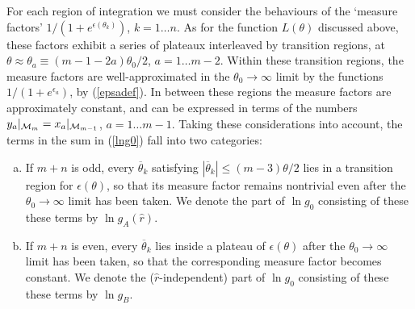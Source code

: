 \documentclass[11pt]{article}
\newcommand\phup{^{\phantom o}}
\newcommand{\CM}{{\cal M}}
\newcommand{\te}{\theta}
\newcommand{\tz}{\theta_0}
\newcommand{\goA}{g\phup_{A}}
\newcommand{\goB}{g\phup_{B}}
\begin{document}
For each region of integration we must consider the behaviours
of the `measure factors' $1/(1+e^{\epsilon(\theta_k)})$, $k=1\dots n$.
As for the function $L(\theta)$ discussed above, these factors exhibit
a series of plateaux interleaved by transition regions, at
$\theta\approx\theta_a\equiv (m{-}1{-}2a)\tz/2$, 
$a=1\dots m{-}2$. Within these
transition regions, the measure factors
are well-approximated in the $\tz\to\infty$ limit by the
functions $1/(1+e^{\epsilon_a})$, by (\ref{epsadef}). In between these
regions the measure factors are approximately constant, and can be
expressed in terms of the numbers $y_a|_{\CM_m}=x_a|_{\CM_{m-1}}$,
$a=1\dots m{-}1$. Taking these considerations into account,
the terms in the sum in (\ref{lng0}) fall into two categories:
%
\begin{enumerate}[(a)]
\item If $m+n$ is odd, every $\overline\te_k$ satisfying 
$|\overline\te_k|\le
(m{-}3)\te/2$ lies in a transition region for $\epsilon(\te)$, so that
its measure factor remains nontrivial even after the
$\theta_0\to\infty$ limit has been taken.  We denote the
part of $\ln g_0$ consisting of these these terms by $\ln
\goA(\hat{r})$.
%
\item If $m+n$ is even, every $\overline\te_k$ lies inside a
plateau of $\epsilon(\te)$ after the $\te_0\to\infty$ limit has been
taken, so that the corresponding measure factor becomes constant. We 
denote the ($\hat{r}$-independent) part of $\ln g_0$ consisting 
of these these terms by $\ln \goB$.
\end{enumerate} 
%
\end{document}
